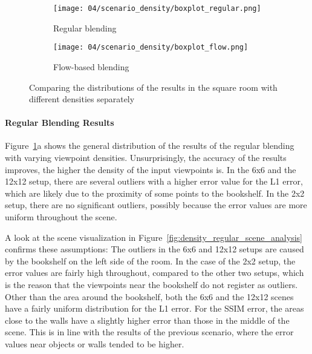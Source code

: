 \begin{figure}
\centering
    \hfill
    \begin{subfigure}[b]{0.5\textwidth}
            \centering
            \texttt{[image: 04/scenario\_density/boxplot\_regular.png]}
            \caption{Regular blending}
    \end{subfigure}%
    \hfill
    \begin{subfigure}[b]{0.5\textwidth}
            \centering
            \texttt{[image: 04/scenario\_density/boxplot\_flow.png]}
            \caption{Flow-based blending}
    \end{subfigure}
    \hfill
  \caption[Comparing the distributions of the results with different densities separately]{Comparing the distributions of the results in the square room with different densities separately}
  \label{fig:density_boxplot_split}
\end{figure}

\paragraph{Regular Blending Results}
Figure~\ref{fig:density_boxplot_split}a shows the general distribution of the results of the regular blending with varying viewpoint densities. Unsurprisingly, the accuracy of the results improves, the higher the density of the input viewpoints is.
In the 6x6 and the 12x12 setup, there are several outliers with a higher error value for the L1 error, which are likely due to the proximity of some points to the bookshelf. In the 2x2 setup, there are no significant outliers, possibly because the error values are more uniform throughout the scene.

A look at the scene visualization in Figure~\ref{fig:density_regular_scene_analysis} confirms these assumptions: The outliers in the 6x6 and 12x12 setups are caused by the bookshelf on the left side of the room. In the case of the 2x2 setup, the error values are fairly high throughout, compared to the other two setups, which is the reason that the viewpoints near the bookshelf do not register as outliers. Other than the area around the bookshelf, both the 6x6 and the 12x12 scenes have a fairly uniform distribution for the L1 error. For the SSIM error, the areas close to the walls have a slightly higher error than those in the middle of the scene. This is in line with the results of the previous scenario, where the error values near objects or walls tended to be higher.

